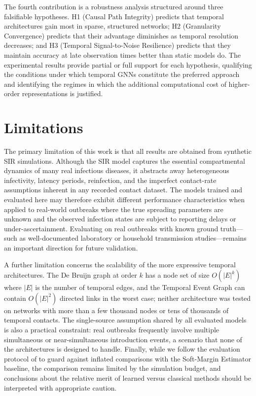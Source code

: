 The fourth contribution is a robustness analysis structured around three
falsifiable hypotheses. H1 (Causal Path Integrity) predicts that temporal
architectures gain most in sparse, structured networks; H2 (Granularity
Convergence) predicts that their advantage diminishes as temporal resolution
decreases; and H3 (Temporal Signal-to-Noise Resilience) predicts that they
maintain accuracy at late observation times better than static models do. The
experimental results provide partial or full support for each hypothesis,
qualifying the conditions under which temporal GNNs constitute the preferred
approach and identifying the regimes in which the additional computational cost
of higher-order representations is justified.

\section{Limitations}
\label{st:limitations_ch}

The primary limitation of this work is that all results are obtained from
synthetic SIR simulations. Although the SIR model captures the essential
compartmental dynamics of many real infectious diseases, it abstracts away
heterogeneous infectivity, latency periods, reinfection, and the imperfect
contact-rate assumptions inherent in any recorded contact dataset. The models
trained and evaluated here may therefore exhibit different performance
characteristics when applied to real-world outbreaks where the true spreading
parameters are unknown and the observed infection states are subject to
reporting delays or under-ascertainment. Evaluating on real outbreaks with
known ground truth---such as well-documented laboratory or household
transmission studies---remains an important direction for future validation.

A further limitation concerns the scalability of the more expressive temporal
architectures. The De Bruijn graph at order $k$ has a node set of size
$O(|E|^k)$ where $|E|$ is the number of temporal edges, and the Temporal Event
Graph can contain $O(|E|^2)$ directed links in the worst case; neither
architecture was tested on networks with more than a few thousand nodes or
tens of thousands of temporal contacts. The single-source assumption shared by
all evaluated models is also a practical constraint: real outbreaks frequently
involve multiple simultaneous or near-simultaneous introduction events, a
scenario that none of the architectures is designed to handle. Finally, while
we follow the evaluation protocol of \cite{Sterchi2025} to guard against
inflated comparisons with the Soft-Margin Estimator baseline, the comparison
remains limited by the simulation budget, and conclusions about the relative
merit of learned versus classical methods should be interpreted with appropriate
caution.

